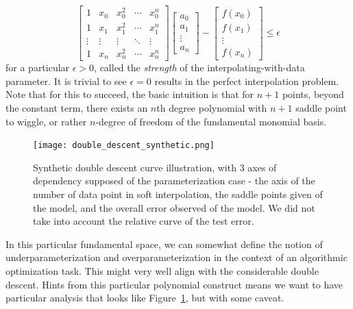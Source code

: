 \documentclass[10pt]{article}
\begin{document}
\begin{equation}
\begin{bmatrix}
1 & x_0 & x_0^2 & \cdots & x_0^n \\
1 & x_1 & x_1^2 & \cdots & x_1^n \\
\vdots & \vdots & \vdots & \ddots & \vdots \\
1 & x_n & x_n^2 & \cdots & x_n^n
\end{bmatrix}
\begin{bmatrix}
a_0 \\
a_1 \\
\vdots \\
a_n
\end{bmatrix}
- 
\begin{bmatrix}
f(x_0) \\
f(x_1) \\
\vdots \\
f(x_n)
\end{bmatrix}
\leq \epsilon
\end{equation}
for a particular $\epsilon > 0$, called the \textit{strength} of the interpolating-with-data parameter. It is trivial to see $\epsilon = 0$ results in the perfect interpolation problem. Note that for this to succeed, the basic intuition is that for $n+1$ points, beyond the constant term, there exists an $n$th degree polynomial with $n+1$ saddle point to wiggle, or rather $n$-degree of freedom of the fundamental monomial basis. 

\begin{figure}[htb]
    \centering
    \texttt{[image: double\_descent\_synthetic.png]}
    \caption{Synthetic double descent curve illustration, with 3 axes of dependency supposed of the parameterization case - the axis of the number of data point in soft interpolation, the saddle points given of the model, and the overall error observed of the model. We did not take into account the relative curve of the test error.}
    \label{fig:descent_synthetic_curve}
\end{figure}

In this particular fundamental space, we can somewhat define the notion of underparameterization and overparameterization in the context of an algorithmic optimization task. This might very well align with the considerable double descent. Hints from this particular polynomial construct means we want to have particular analysis that looks like Figure~\ref{fig:descent_synthetic_curve}, but with some caveat. 
\end{document}
